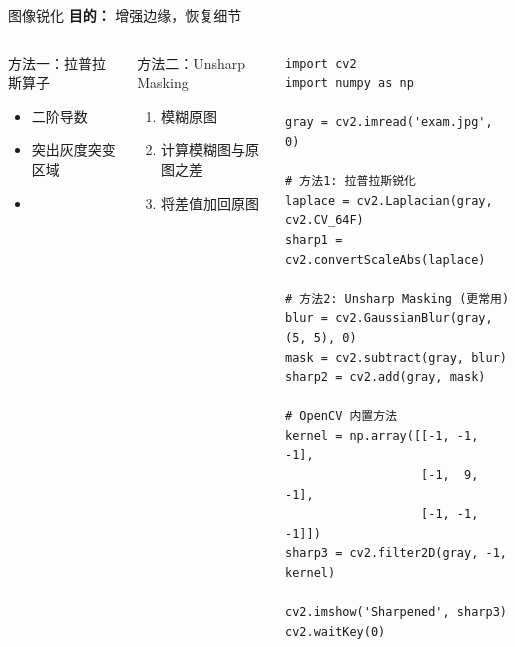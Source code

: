 \begin{frame}[fragile]{图像锐化}
    \textbf{目的：} 增强边缘，恢复细节

    \begin{columns}
        \begin{block}{方法一：拉普拉斯算子}
            \begin{itemize}
                \item 二阶导数
                \item 突出灰度突变区域
                \item {}
            \end{itemize}
        \end{block}

        \begin{block}{方法二：Unsharp Masking}
            \begin{enumerate}
                \item 模糊原图
                \item 计算模糊图与原图之差
                \item 将差值加回原图
            \end{enumerate}
        \end{block}

        \begin{lstlisting}[basicstyle=\ttfamily\scriptsize]
import cv2
import numpy as np

gray = cv2.imread('exam.jpg', 0)

# 方法1: 拉普拉斯锐化
laplace = cv2.Laplacian(gray, cv2.CV_64F)
sharp1 = cv2.convertScaleAbs(laplace)

# 方法2: Unsharp Masking (更常用)
blur = cv2.GaussianBlur(gray, (5, 5), 0)
mask = cv2.subtract(gray, blur)
sharp2 = cv2.add(gray, mask)

# OpenCV 内置方法
kernel = np.array([[-1, -1, -1],
                   [-1,  9, -1],
                   [-1, -1, -1]])
sharp3 = cv2.filter2D(gray, -1, kernel)

cv2.imshow('Sharpened', sharp3)
cv2.waitKey(0)
        \end{lstlisting}
    \end{columns}
\end{frame}

